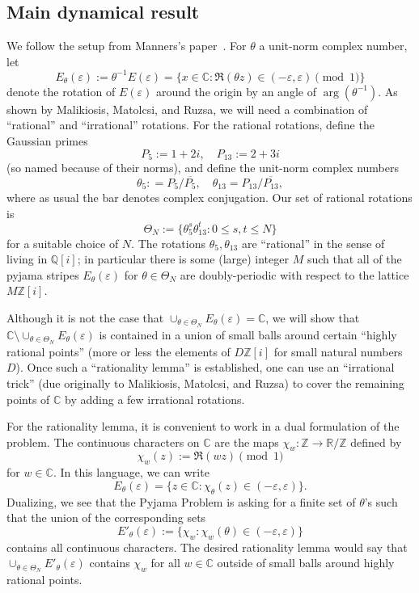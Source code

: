 \documentclass[11pt]{amsart}
\theoremstyle{definition}
\begin{document}

\subsection{Main dynamical result}

We follow the setup from Manners's paper~\cite[Section 5]{Man13}.  For $\theta$ a unit-norm complex number, let $$E_\theta(\varepsilon):=\theta^{-1}E(\varepsilon)=\{x \in \mathbb{C}: \Re(\theta z) \in (-\varepsilon, \varepsilon) \pmod{1}\}$$ denote the rotation of $E(\varepsilon)$ around the origin by an angle of $\arg(\theta^{-1})$.  As shown by Malikiosis, Matolcsi, and Ruzsa, we will need a combination of ``rational'' and ``irrational'' rotations.  For the rational rotations, define the Gaussian primes
$$P_5:=1+2i, \quad P_{13}:=2+3i$$
(so named because of their norms),
and define the unit-norm complex numbers
$$\theta_5: = P_5/\overline{P_5}, \quad \theta_{13} = P_{13}/\overline{P_{13}},$$
where as usual the bar denotes complex conjugation.  Our set of rational rotations is $$\Theta_N:= \{\theta_5^s\theta_{13}^t: 0 \leq s, t \leq N\}$$
for a suitable choice of $N$.  The rotations $\theta_5,\theta_{13}$ are ``rational'' in the sense of living in $\mathbb{Q}[i]$; in particular there is some (large) integer $M$ such that all of the pyjama stripes $E_\theta(\varepsilon)$ for $\theta \in \Theta_N$ are doubly-periodic with respect to the lattice $M\mathbb{Z}[i]$.

Although it is not the case that $\cup_{\theta \in \Theta_N} E_\theta(\varepsilon)=\mathbb{C}$, we will show that $\mathbb{C} \setminus \cup_{\theta \in \Theta_N} E_\theta(\varepsilon)$ is contained in a union of small balls around certain ``highly rational points'' (more or less the elements of $D\mathbb{Z}[i]$ for small natural numbers $D$).  Once such a ``rationality lemma'' is established, one can use an ``irrational trick'' (due originally to Malikiosis, Matolcsi, and Ruzsa) to cover the remaining points of $\mathbb{C}$ by adding a few irrational rotations.

For the rationality lemma, it is convenient to work in a dual formulation of the problem.  The continuous characters on $\mathbb{C}$ are the maps $\chi_w: \mathbb{Z} \to \mathbb{R}/\mathbb{Z}$ defined by
$$\chi_w(z):=\Re(wz) \pmod{1}$$
for $w \in \mathbb{C}$.  In this language, we can write
$$E_\theta(\varepsilon)=\{z \in \mathbb{C}: \chi_\theta(z) \in (-\varepsilon, \varepsilon) \}.$$
Dualizing, we see that the Pyjama Problem is asking for a finite set of $\theta$'s such that the union of the corresponding sets
$$E'_\theta(\varepsilon):=\{\chi_w: \chi_w(\theta) \in (-\varepsilon, \varepsilon)\}$$
contains all continuous characters.  The desired rationality lemma would say that $\cup_{\theta \in \Theta_N} E'_\theta(\varepsilon)$ contains $\chi_w$ for all $w \in \mathbb{C}$ outside of small balls around highly rational points.
\end{document}
